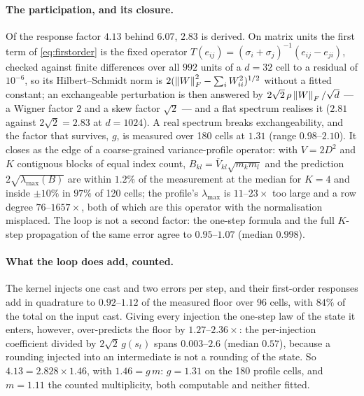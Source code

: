 \paragraph{The participation, and its closure.}  Of the response factor $4.13$ behind
$6.07$, $2.83$ is derived.  On matrix units the first term of \eqref{eq:firstorder} is the
fixed operator $T(e_{ij})=(\sigma_i+\sigma_j)^{-1}(e_{ij}-e_{ji})$, checked against finite
differences over all $992$ units of a $d=32$ cell to a residual of $10^{-6}$, so its
Hilbert--Schmidt norm is $2(\left\lVert W \right\rVert_F^2-\sum_iW_{ii}^2)^{1/2}$ without a fitted constant;
an exchangeable perturbation is then answered by $2\sqrt2\,\rho\left\lVert W \right\rVert_F/\sqrt d$ --- a
Wigner factor $2$ and a skew factor $\sqrt2$ --- and a flat spectrum realises it ($2.81$
against $2\sqrt2=2.83$ at $d=1024$).  A real spectrum breaks exchangeability, and the
factor that survives, $g$, is measured over 180 cells at $1.31$ (range $0.98$--$2.10$).
It closes as the edge of a coarse-grained variance-profile operator: with $V=2D^2$ and $K$
contiguous blocks of equal index count, $B_{kl}=\overline{V}_{kl}\sqrt{m_km_l}$ and the
prediction $2\sqrt{\lambda_{\max}(B)}$ are within $1.2\%$ of the measurement at the
median for $K=4$ and inside $\pm10\%$ in $97\%$ of 120 cells; the profile's
$\lambda_{\max}$ is $11$--$23\times$ too large and a row degree $76$--$1657\times$, both
of which are this operator with the normalisation misplaced.  The loop is not a second
factor: the one-step formula and the full $K$-step propagation of the same error agree to
$0.95$--$1.07$ (median $0.998$).

\paragraph{What the loop does add, counted.}  The kernel injects one cast and two errors
per step, and their first-order responses add in quadrature to $0.92$--$1.12$ of the
measured floor over 96 cells, with $84\%$ of the total on the input cast.  Giving every
injection the one-step law of the state it enters, however, over-predicts the floor by
$1.27$--$2.36\times$: the per-injection coefficient divided by $2\sqrt2\,g(s_t)$ spans
$0.003$--$2.6$ (median $0.57$), because a rounding injected into an intermediate is not a
rounding of the state.  So $4.13=2.828\times1.46$, with $1.46=g\,m$: $g=1.31$ on the 180 profile cells,
and $m=1.11$ the counted multiplicity, both computable and neither fitted.

